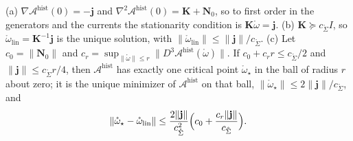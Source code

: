 \begin{proposition}\label{prop:llp_linearized}
(a) $\nabla\mathcal A^{\mathrm{hist}}(0)=-\mathbf j$ and $\nabla^2\mathcal A^{\mathrm{hist}}(0)=\mathbf K+\mathbf N_0$, so to first order in the generators and the currents the stationarity condition is $\mathbf K\mathring\omega=\mathbf j$.
(b) $\mathbf K\succeq c_{\mathring\Sigma}I$, so $\mathring\omega_{\mathrm{lin}}=\mathbf K^{-1}\mathbf j$ is the unique solution, with $\|\mathring\omega_{\mathrm{lin}}\|\leq\|\mathbf j\|/c_{\mathring\Sigma}$.
(c) Let $c_0=\|\mathbf N_0\|$ and $c_r=\sup_{\|\mathring\omega\|\leq r}\|D^3\mathcal A^{\mathrm{hist}}(\mathring\omega)\|$. If $c_0+c_rr\leq c_{\mathring\Sigma}/2$ and $\|\mathbf j\|\leq c_{\mathring\Sigma}r/4$, then $\mathcal A^{\mathrm{hist}}$ has exactly one critical point $\mathring\omega_\star$ in the ball of radius $r$ about zero; it is the unique minimizer of $\mathcal A^{\mathrm{hist}}$ on that ball, $\|\mathring\omega_\star\|\leq2\|\mathbf j\|/c_{\mathring\Sigma}$, and
\begin{equation}
\|\mathring\omega_\star-\mathring\omega_{\mathrm{lin}}\|\leq\frac{2\|\mathbf j\|}{c_{\mathring\Sigma}^2}\Bigl(c_0+\frac{c_r\|\mathbf j\|}{c_{\mathring\Sigma}}\Bigr).
\label{eq:llp_linearization_error}
\end{equation}
\end{proposition}


